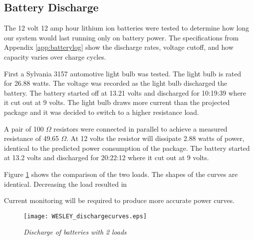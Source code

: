 \subsection{Battery Discharge}

The 12 volt 12 amp hour lithium ion batteries were tested to determine how long our system would last running only on battery power.  The specifications from Appendix \ref{app:batterylog} show the discharge rates, voltage cutoff, and how capacity varies over charge cycles.

\indent First a Sylvania 3157 automotive light bulb was tested. The light bulb is rated for 26.88 watts.  The voltage was recorded as the light bulb discharged the battery. The battery started off at 13.21 volts and discharged for 10:19:39 where it cut out at 9 volts. The light bulb draws more current than the projected package and it was decided to switch to a higher resistance load.
 
\indent A pair of 100 $\Omega$ resistors were connected in parallel to achieve a measured resistance of 49.65  $\Omega$. At 12 volts the resistor will dissipate 2.88 watts of power, identical to the predicted power consumption of the package.  The battery started at 13.2 volts and discharged for 20:22:12 where it cut out at 9 volts. 

\indent Figure \ref{fig:discharge} shows the comparison of the two loads. The shapes of the curves are identical. Decreasing the load resulted in 

\indent Current monitoring will be required to produce more accurate power curves. 

\begin{figure}
\centering
\texttt{[image: WESLEY\_dischargecurves.eps]}
 \caption{\textit{Discharge of batteries with 2 loads}}
\label{fig:discharge}
\end{figure}

